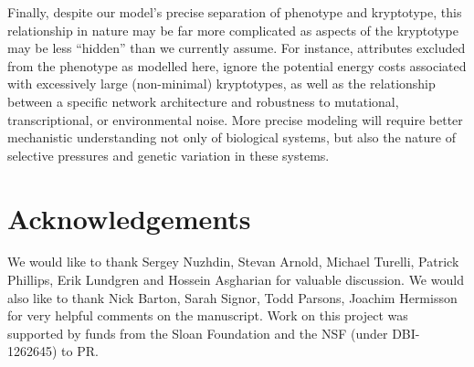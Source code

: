 \documentclass{article}
\newif\ifsubmission
\newcommand{\1}{\mathbbm{1}}
\begin{document}
Finally, despite our model's precise separation of phenotype and kryptotype, this relationship in nature may be far more complicated as aspects of the kryptotype may be less ``hidden'' than we currently assume. For instance, attributes excluded from the phenotype as modelled here, ignore the potential energy costs associated with excessively large (non-minimal) kryptotypes, as well as the relationship between a specific network architecture and robustness to mutational, transcriptional, or environmental noise.
More precise modeling will require better mechanistic understanding not only of biological systems,
but also the nature of selective pressures
and genetic variation in these systems.

%

\section*{Acknowledgements}

    We would like to thank Sergey Nuzhdin, Stevan Arnold, Michael Turelli, Patrick Phillips, Erik Lundgren and Hossein Asgharian for valuable discussion. 
    We would also like to thank Nick Barton, Sarah Signor, Todd Parsons, Joachim Hermisson for very helpful comments on the manuscript.
    Work on this project was supported by funds from
    the Sloan Foundation and the NSF (under DBI-1262645) to PR.






\normalsize
\appendix



\end{document}
